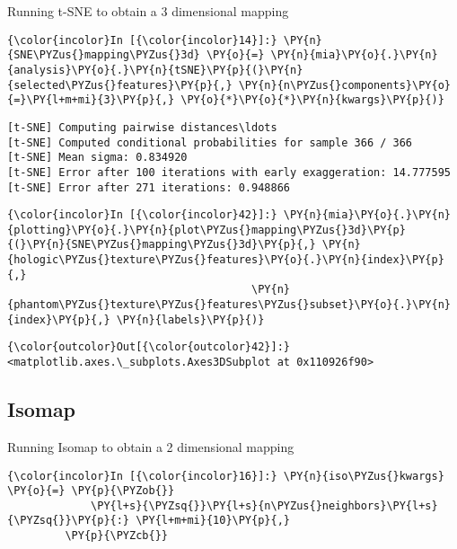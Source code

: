     Running t-SNE to obtain a 3 dimensional mapping

    \begin{Verbatim}[commandchars=\\\{\}]
{\color{incolor}In [{\color{incolor}14}]:} \PY{n}{SNE\PYZus{}mapping\PYZus{}3d} \PY{o}{=} \PY{n}{mia}\PY{o}{.}\PY{n}{analysis}\PY{o}{.}\PY{n}{tSNE}\PY{p}{(}\PY{n}{selected\PYZus{}features}\PY{p}{,} \PY{n}{n\PYZus{}components}\PY{o}{=}\PY{l+m+mi}{3}\PY{p}{,} \PY{o}{*}\PY{o}{*}\PY{n}{kwargs}\PY{p}{)}
\end{Verbatim}

    \begin{Verbatim}[commandchars=\\\{\}]
[t-SNE] Computing pairwise distances\ldots
[t-SNE] Computed conditional probabilities for sample 366 / 366
[t-SNE] Mean sigma: 0.834920
[t-SNE] Error after 100 iterations with early exaggeration: 14.777595
[t-SNE] Error after 271 iterations: 0.948866
    \end{Verbatim}

    \begin{Verbatim}[commandchars=\\\{\}]
{\color{incolor}In [{\color{incolor}42}]:} \PY{n}{mia}\PY{o}{.}\PY{n}{plotting}\PY{o}{.}\PY{n}{plot\PYZus{}mapping\PYZus{}3d}\PY{p}{(}\PY{n}{SNE\PYZus{}mapping\PYZus{}3d}\PY{p}{,} \PY{n}{hologic\PYZus{}texture\PYZus{}features}\PY{o}{.}\PY{n}{index}\PY{p}{,}
                                      \PY{n}{phantom\PYZus{}texture\PYZus{}features\PYZus{}subset}\PY{o}{.}\PY{n}{index}\PY{p}{,} \PY{n}{labels}\PY{p}{)}
\end{Verbatim}

            \begin{Verbatim}[commandchars=\\\{\}]
{\color{outcolor}Out[{\color{outcolor}42}]:} <matplotlib.axes.\_subplots.Axes3DSubplot at 0x110926f90>
\end{Verbatim}

    \subsection{Isomap}\label{isomap}

Running Isomap to obtain a 2 dimensional mapping

    \begin{Verbatim}[commandchars=\\\{\}]
{\color{incolor}In [{\color{incolor}16}]:} \PY{n}{iso\PYZus{}kwargs} \PY{o}{=} \PY{p}{\PYZob{}}
             \PY{l+s}{\PYZsq{}}\PY{l+s}{n\PYZus{}neighbors}\PY{l+s}{\PYZsq{}}\PY{p}{:} \PY{l+m+mi}{10}\PY{p}{,}
         \PY{p}{\PYZcb{}}
\end{Verbatim}

